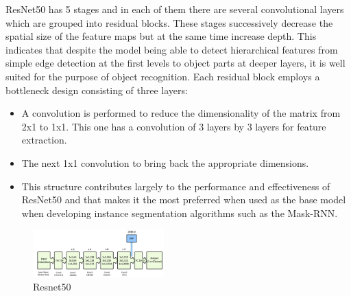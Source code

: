 \documentclass[conference]{IEEEtran}
\begin{document}
ResNet50 has 5 stages and in each of them there are several convolutional layers which are grouped into residual blocks. These stages successively decrease the spatial size of the feature maps but at the same time increase depth. This indicates that despite the model being able to detect hierarchical features from simple edge detection at the first levels to object parts at deeper layers, it is well suited for the purpose of object recognition. Each residual block employs a bottleneck design consisting of three layers:

\begin{itemize}
    \item A convolution is performed to reduce the dimensionality of the matrix from 2x1 to 1x1. This one has a convolution of 3 layers by 3 layers for feature extraction.
    \item The next 1x1 convolution to bring back the appropriate dimensions.
    \item This structure contributes largely to the performance and effectiveness of ResNet50 and that makes it the most preferred when used as the base model when developing instance segmentation algorithms such as the Mask-RNN.\\
\end{itemize}
\begin{figure}[htbp]
    \centering
    \includegraphics[width=0.45\textwidth]{resnet50.jpg} 
    \caption{Resnet50}
    \label{fig}
\end{figure}
\end{document}
